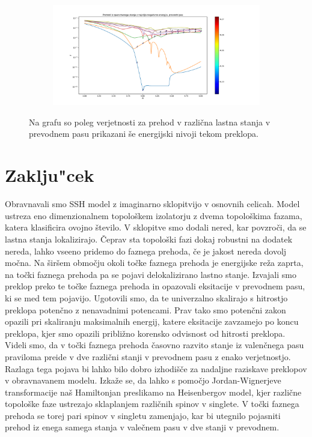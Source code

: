 \begin{figure}[H]
\centering
\begin{subfigure}{\textwidth}
\includegraphics[width=\linewidth]{Figures/IzEngaStanjaWBand.pdf}
\end{subfigure}
\caption{Na grafu so poleg verjetnosti za prehod v različna lastna stanja v prevodnem pasu prikazani še energijski nivoji tekom preklopa.}
\label{fig:IzEngaStanjaWBand}
\end{figure}
%
\chapter{Zaklju"cek}
Obravnavali smo SSH model z imaginarno sklopitvijo v osnovnih celicah. Model ustreza eno dimenzionalnem topološkem izolatorju z dvema topološkima fazama, katera klasificira ovojno število. V sklopitve smo dodali nered, kar povzroči, da se lastna stanja lokalizirajo. Čeprav sta topološki fazi dokaj robustni na dodatek nereda, lahko vseeno pridemo do faznega prehoda, če je jakost nereda dovolj močna. Na širšem območju okoli točke faznega prehoda je energijske reža zaprta, na točki faznega prehoda pa se pojavi delokalizirano lastno stanje.  
Izvajali smo preklop preko te točke faznega prehoda in opazovali eksitacije v prevodnem pasu, ki se med tem pojavijo. Ugotovili smo, da te univerzalno skalirajo s hitrostjo preklopa potenčno z nenavadnimi potencami. Prav tako smo potenčni zakon opazili pri skaliranju maksimalnih energij, katere eksitacije zavzamejo po koncu preklopa, kjer smo opazili približno korensko odvisnost od hitrosti preklopa.
Videli smo, da v točki faznega prehoda časovno razvito stanje iz valenčnega pasu praviloma preide v dve različni stanji v prevodnem pasu z enako verjetnostjo. Razlaga tega pojava bi lahko bilo dobro izhodišče za nadaljne raziskave preklopov v obravnavanem modelu. Izkaže se, da lahko s pomočjo Jordan-Wignerjeve transformacije naš Hamiltonjan preslikamo na Heisenbergov model, kjer različne topološke faze ustrezajo sklaplanjem različnih spinov v singlete. V točki faznega prehoda se torej pari spinov v singletu zamenjajo, kar bi utegnilo pojasniti prehod iz enega samega stanja v valečnem pasu v dve stanji v prevodnem.

